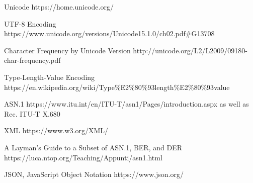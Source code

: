 \newpage
\begin{thebibliography}{12}

\setlength{\leftskip}{-5cm}

  Unicode
  https://home.unicode.org/

  UTF-8 Encoding
  https://www.unicode.org/versions/Unicode15.1.0/ch02.pdf\#G13708

  Character Frequency by Unicode Version
  http://unicode.org/L2/L2009/09180-char-frequency.pdf

  Type-Length-Value Encoding
  https://en.wikipedia.org/wiki/Type\%E2\%80\%93length\%E2\%80\%93value

  ASN.1
  https://www.itu.int/en/ITU-T/asn1/Pages/introduction.aspx
  as well as Rec. ITU-T X.680

  XML
  https://www.w3.org/XML/

  A Layman's Guide to a Subset of ASN.1, BER, and DER
  https://luca.ntop.org/Teaching/Appunti/asn1.html

  JSON, JavaScript Object Notation
  https://www.json.org/

\setlength{\leftskip}{0cm}

\end{thebibliography}
